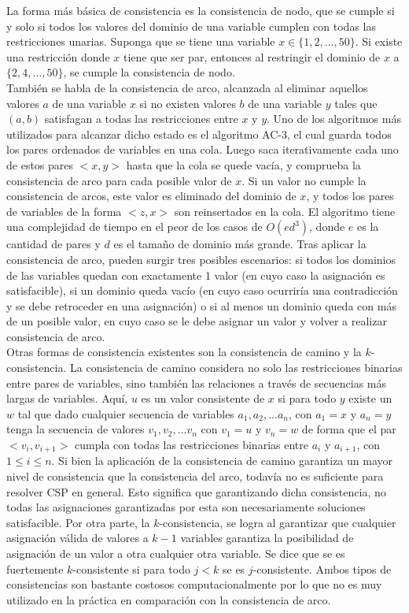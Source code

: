 \documentclass[12pt]{report}
\begin{document}
La forma más básica de consistencia es la consistencia de nodo, que se cumple si y solo si todos los valores del dominio de una variable cumplen con todas las restricciones unarias. Suponga que se tiene una variable $x \in \{1,2,...,50\}$. Si existe una restricción donde $x$ tiene que ser par, entonces al restringir el dominio de $x$ a $\{2,4,...,50\}$, se cumple la consistencia de nodo.\\

También se habla de la consistencia de arco, alcanzada al eliminar aquellos valores $a$ de una variable $x$ si no existen valores $b$ de una variable $y$ tales que $(a,b)$ satisfagan a todas las restricciones entre $x$ y $y$. Uno de los algoritmos más utilizados para alcanzar dicho estado es el algoritmo AC-3, el cual guarda todos los pares ordenados de variables en una cola. Luego saca iterativamente cada uno de estos pares $<x,y>$ hasta que la cola se quede vacía, y comprueba la consistencia de arco para cada posible valor de $x$. Si un valor no cumple la consistencia de arcos, este valor es eliminado del dominio de $x$, y todos los pares de variables de la forma $<z,x>$ son reinsertados en la cola. El algoritmo tiene una complejidad de tiempo en el peor de los casos de $O(ed^3 )$, donde $e$ es la cantidad de pares y $d$ es el tamaño de dominio más grande. Tras aplicar la consistencia de arco, pueden surgir tres posibles escenarios: si todos los dominios de las variables quedan con exactamente 1 valor (en cuyo caso la asignación es satisfacible), si un dominio queda vacío (en cuyo caso ocurriría una contradicción y se debe retroceder en una asignación) o si al menos un dominio queda con más de un posible valor, en cuyo caso se le debe asignar un valor y volver a realizar consistencia de arco.\\

Otras formas de consistencia existentes son la consistencia de camino y la $k$-consistencia. La consistencia de camino considera no solo las restricciones binarias entre pares de variables, sino también las relaciones a través de secuencias más largas de variables. Aquí, $u$ es un valor consistente de $x$ si para todo $y$ existe un $w$ tal que dado cualquier secuencia de variables $a_1, a_2, ... a_n$, con $a_1=x$ y $a_n=y$ tenga la secuencia de valores $v_1, v_2, ... v_n$ con $v_1=u$ y $v_n=w$ de forma que el par $<v_i,v_{i+1}>$ cumpla con todas las restricciones binarias entre $a_i$ y $a_{i+1}$, con $1\leq  i \leq  n$. Si bien la aplicación de la consistencia de camino garantiza un mayor nivel de consistencia que la consistencia del arco, todavía no es suficiente para resolver CSP en general. Esto significa que garantizando dicha consistencia, no todas las asignaciones garantizadas por esta son necesariamente soluciones satisfacible. Por otra parte, la $k$-consistencia, se logra al garantizar que cualquier asignación válida de valores a $k-1$ variables garantiza la posibilidad de asignación de un valor a otra cualquier otra variable. Se dice que se es fuertemente $k$-consistente si para todo $j<k$ se es $j$-consistente. Ambos tipos de consistencias son bastante costosos computacionalmente por lo que no es muy utilizado en la práctica en comparación con la consistencia de arco.\\
\end{document}
